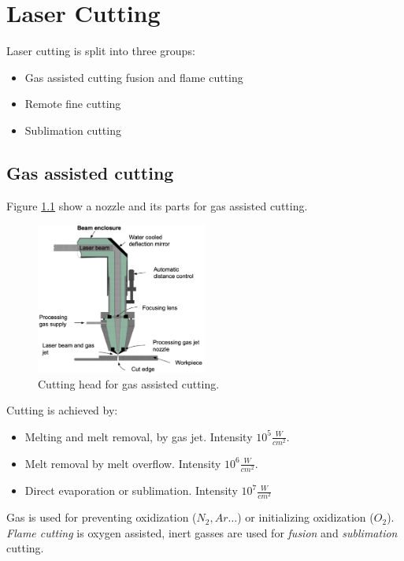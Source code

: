 \chapter{Laser Cutting}
Laser cutting is split into three groups:
\begin{itemize}
    \item Gas assisted cutting \pd fusion and flame cutting
    \item Remote fine cutting
    \item Sublimation cutting
\end{itemize}

\section{Gas assisted cutting}

Figure \ref{fig:gcutinghead} show a nozzle and its parts for gas assisted cutting. 
\begin{figure}[h!]
    \centering
    \includegraphics[width=0.5\textwidth]{slike/gasnozzle.png}
    \caption{Cutting head for gas assisted cutting. \sln}
    \label{fig:gcutinghead}
\end{figure}

Cutting is achieved by:
\begin{itemize}
    \item Melting and melt removal, by gas jet. Intensity \pd $10^5 \frac{W}{cm^2}$.
    \item Melt removal by melt overflow. Intensity \pd $10^6 \frac{W}{cm^2}$.
    \item Direct evaporation or sublimation. Intensity \pd $10^7 \frac{W}{cm^2}$
\end{itemize}

Gas is used for preventing oxidization ($N_2, Ar \dots$) or initializing oxidization ($O_2$).
\textit{Flame cutting} is oxygen assisted, inert gasses are used for \textit{fusion}
and \textit{sublimation} cutting. 

